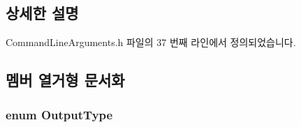 \subsection{상세한 설명}


Command\+Line\+Arguments.\+h 파일의 37 번째 라인에서 정의되었습니다.



\subsection{멤버 열거형 문서화}
\subsubsection[{\texorpdfstring{Output\+Type}{OutputType}}]{\setlength{\rightskip}{0pt plus 5cm}enum {\bf Output\+Type}\hspace{0.3cm}{\ttfamily [private]}}\hypertarget{class_command_line_arguments_a4e0517338e6c4a31a2addafc06d4f3a3}{}\label{class_command_line_arguments_a4e0517338e6c4a31a2addafc06d4f3a3}
